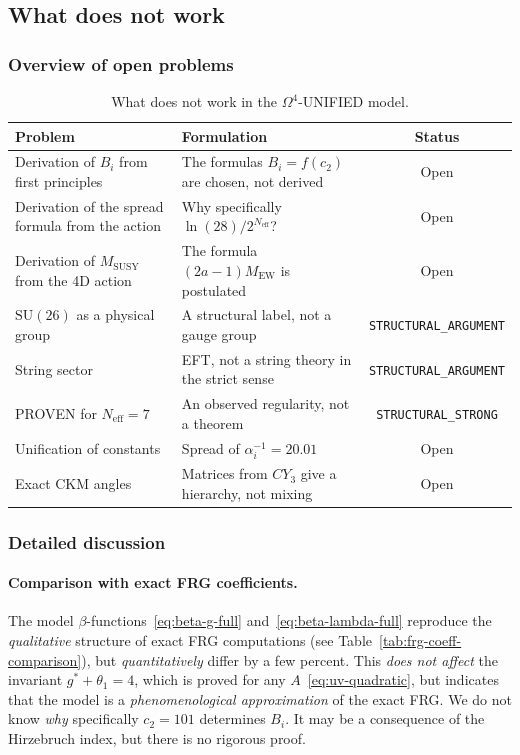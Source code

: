 \documentclass[11pt,a4paper]{article}
\newcommand{\SU}{\ensuremath{\mathrm{SU}}}
\newcommand{\CY}{\ensuremath{CY_3}}
\newcommand{\Om}{\ensuremath{\Omega^4}}
\theoremstyle{definition}
\begin{document}
\subsection{What does not work}
\label{subsec:disc-fails}

\subsubsection{Overview of open problems}

\begin{table}[ht]
\centering
\caption{What does not work in the \texorpdfstring{$\Om$}{}-UNIFIED model.}
\label{tab:fails-disc}
\begin{tabular}{p{4.5cm}p{6cm}c}
\toprule
Problem & Formulation & Status \\
\midrule
Derivation of $B_i$ from first principles
    & The formulas $B_i = f(c_2)$ are chosen, not derived
    & Open \\[0.3em]
Derivation of the spread formula from the action
    & Why specifically $\ln(28)/2^{N_{\text{eff}}}$?
    & Open \\[0.3em]
Derivation of $M_{\text{SUSY}}$ from the 4D action
    & The formula $(2a-1) M_{\text{EW}}$ is postulated
    & Open \\[0.3em]
$\SU(26)$ as a physical group
    & A structural label, not a gauge group
    & \texttt{STRUCTURAL\_ARGUMENT} \\[0.3em]
String sector
    & EFT, not a string theory in the strict sense
    & \texttt{STRUCTURAL\_ARGUMENT} \\[0.3em]
PROVEN for $N_{\text{eff}} = 7$
    & An observed regularity, not a theorem
    & \texttt{STRUCTURAL\_STRONG} \\[0.3em]
Unification of constants
    & Spread of $\alpha_i^{-1} = 20.01$
    & Open \\[0.3em]
Exact CKM angles
    & Matrices from $\CY$ give a hierarchy, not mixing
    & Open \\
\bottomrule
\end{tabular}
\end{table}

\subsubsection{Detailed discussion}

\paragraph{Comparison with exact FRG coefficients.}
The model $\beta$-functions~\eqref{eq:beta-g-full}
and~\eqref{eq:beta-lambda-full} reproduce the
\emph{qualitative} structure of exact FRG computations
(see Table~\ref{tab:frg-coeff-comparison}), but
\emph{quantitatively} differ by a few percent.
This \emph{does not affect} the invariant $g^* + \theta_1 = 4$,
which is proved for any $A$~\eqref{eq:uv-quadratic},
but indicates that the model is a \emph{phenomenological
approximation} of the exact FRG.
We do not know \emph{why} specifically $c_2 = 101$ determines $B_i$.
It may be a consequence of the Hirzebruch index, but there is no rigorous
proof.
\end{document}
